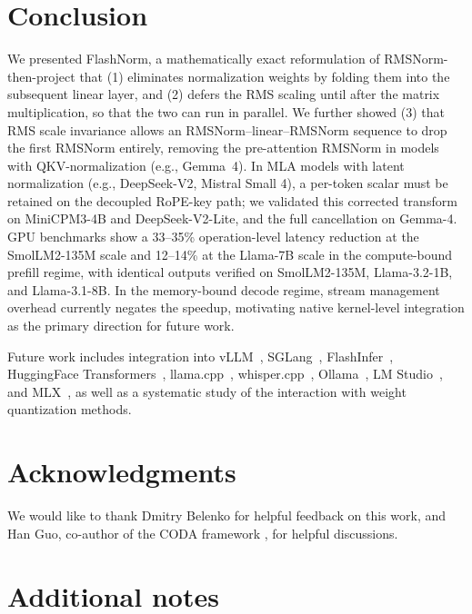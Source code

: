 \documentclass{article}
\begin{document}
\section{Conclusion}
We presented FlashNorm, a mathematically exact reformulation of RMSNorm-then-project
that (1) eliminates normalization weights by folding them into the subsequent linear
layer, and (2) defers the RMS scaling until after the matrix multiplication,
so that the two can run in parallel.
We further showed (3) that RMS scale invariance allows an RMSNorm--linear--RMSNorm sequence
to drop the first RMSNorm entirely,
removing the pre-attention RMSNorm in models with QKV-normalization (e.g., Gemma~4).
In MLA models with latent normalization (e.g., DeepSeek-V2, Mistral Small 4), a per-token
scalar must be retained on the decoupled RoPE-key path; we validated this corrected
transform on MiniCPM3-4B and DeepSeek-V2-Lite, and the full cancellation on Gemma-4.
GPU benchmarks show a 33--35\% operation-level latency reduction at
the SmolLM2-135M scale and 12--14\% at the Llama-7B scale
in the compute-bound prefill regime, with identical outputs verified on
SmolLM2-135M, Llama-3.2-1B, and Llama-3.1-8B.
In the memory-bound decode regime, stream management overhead
currently negates the speedup, motivating native kernel-level integration as the
primary direction for future work.

Future work includes integration into
vLLM~\citep{vLLM}, SGLang~\citep{sglang}, FlashInfer~\citep{flashInfer},
HuggingFace Transformers~\citep{HFtransformers},
llama.cpp~\citep{llama-cpp}, whisper.cpp~\citep{whisper-cpp},
Ollama~\citep{ollama}, LM Studio~\citep{lmstudio}, and MLX~\citep{mlx}, as well as a systematic
study of the interaction with weight quantization methods.

\section*{Acknowledgments}
We would like to thank Dmitry Belenko for helpful feedback on this work, and Han Guo, co-author of the CODA framework \citep{coda}, for helpful discussions.

\appendix

\section{Additional notes}\label{app:additional-notes}
\end{document}
